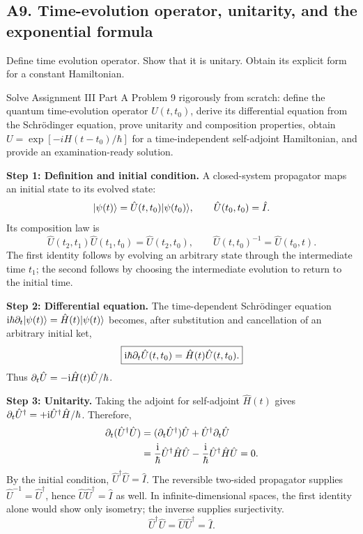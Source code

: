 \documentclass[11pt,a4paper]{article}
\begin{document}
\subsection{A9. Time-evolution operator, unitarity, and the exponential formula}
\begin{questionbox}
Define time evolution operator. Show that it is unitary. Obtain its explicit form for a constant Hamiltonian.
\end{questionbox}
\begin{studybox}
Solve Assignment III Part A Problem 9 rigorously from scratch: define the quantum time-evolution operator \(U(t,t_0)\), derive its differential equation from the Schr\"odinger equation, prove unitarity and composition properties, obtain \(U=\exp[-iH(t-t_0)/\hbar]\) for a time-independent self-adjoint Hamiltonian, and provide an examination-ready solution.
\end{studybox}
\textbf{Step 1: Definition and initial condition.} A closed-system propagator maps an initial state to its evolved state:
\begin{equation}|\psi(t)\rangle=\hat U(t,t_0)|\psi(t_0)\rangle,\qquad\hat U(t_0,t_0)=\hat I.\end{equation}
Its composition law is
\begin{equation}\hat U(t_2,t_1)\hat U(t_1,t_0)=\hat U(t_2,t_0),\qquad\hat U(t,t_0)^{-1}=\hat U(t_0,t).\end{equation}
The first identity follows by evolving an arbitrary state through the intermediate time \(t_1\); the second follows by choosing the intermediate evolution to return to the initial time.

\textbf{Step 2: Differential equation.} The time-dependent Schr\"odinger equation \(\mathrm{i}\hbar\partial_t|\psi(t)\rangle=\hat H(t)|\psi(t)\rangle\) becomes, after substitution and cancellation of an arbitrary initial ket,
\begin{equation}\boxed{\mathrm{i}\hbar\partial_t\hat U(t,t_0)=\hat H(t)\hat U(t,t_0).}\end{equation}
Thus \(\partial_t\hat U=-\mathrm{i}\hat H(t)\hat U/\hbar\).

\textbf{Step 3: Unitarity.} Taking the adjoint for self-adjoint \(\hat H(t)\) gives \(\partial_t\hat U^\dagger=+\mathrm{i}\hat U^\dagger\hat H/\hbar\). Therefore,
\begin{align}
\partial_t(\hat U^\dagger\hat U)
&=(\partial_t\hat U^\dagger)\hat U+\hat U^\dagger\partial_t\hat U\\
&=\frac{\mathrm{i}}{\hbar}\hat U^\dagger\hat H\hat U-\frac{\mathrm{i}}{\hbar}\hat U^\dagger\hat H\hat U=0.
\end{align}
By the initial condition, \(\hat U^\dagger\hat U=\hat I\). The reversible two-sided propagator supplies \(\hat U^{-1}=\hat U^\dagger\), hence \(\hat U\hat U^\dagger=\hat I\) as well. In infinite-dimensional spaces, the first identity alone would show only isometry; the inverse supplies surjectivity.
\begin{equation}\boxed{\hat U^\dagger\hat U=\hat U\hat U^\dagger=\hat I.}\end{equation}
\end{document}
